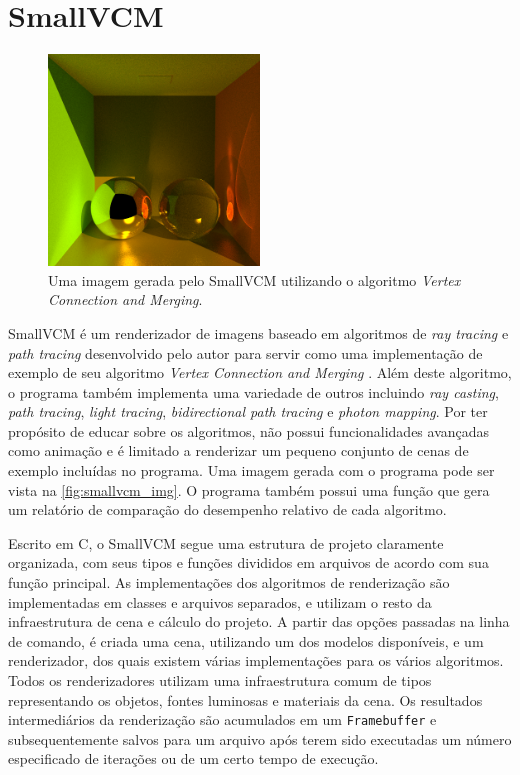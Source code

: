 \documentclass[tg]{mdtufsm}
\def\Cpp{{C\nolinebreak[4]\raisebox{.20ex}{\small\bf++}}}
\begin{document}
\section{SmallVCM}

\begin{figure}
	\centering
	\includegraphics[width=0.5\textwidth]{ggbs_s_vcm}
	\caption[Uma imagem gerada pelo SmallVCM.]{
		Uma imagem gerada pelo SmallVCM utilizando o algoritmo \emph{Vertex Connection and Merging}.
	}
	\label{fig:smallvcm_img}
\end{figure}

SmallVCM \citep{smallvcm} é um renderizador de imagens baseado em algoritmos de \emph{ray tracing} e \emph{path tracing} desenvolvido pelo autor para servir como uma implementação de exemplo de seu algoritmo \emph{Vertex Connection and Merging} \citep{georgiev2012}. Além deste algoritmo, o programa também implementa uma variedade de outros incluindo \emph{ray casting}, \emph{path tracing}, \emph{light tracing}, \emph{bidirectional path tracing} e \emph{photon mapping}. Por ter propósito de educar sobre os algoritmos, não possui funcionalidades avançadas como animação e é limitado a renderizar um pequeno conjunto de cenas de exemplo incluídas no programa. Uma imagem gerada com o programa pode ser vista na \autoref{fig:smallvcm_img}. O programa também possui uma função que gera um relatório de comparação do desempenho relativo de cada algoritmo.

Escrito em \Cpp, o SmallVCM segue uma estrutura de projeto claramente organizada, com seus tipos e funções divididos em arquivos de acordo com sua função principal. As implementações dos algoritmos de renderização são implementadas em classes e arquivos separados, e utilizam o resto da infraestrutura de cena e cálculo do projeto. A partir das opções passadas na linha de comando, é criada uma cena, utilizando um dos modelos disponíveis, e um renderizador, dos quais existem várias implementações para os vários algoritmos. Todos os renderizadores utilizam uma infraestrutura comum de tipos representando os objetos, fontes luminosas e materiais da cena. Os resultados intermediários da renderização são acumulados em um \texttt{Framebuffer} e subsequentemente salvos para um arquivo após terem sido executadas um número especificado de iterações ou de um certo tempo de execução.
\end{document}

